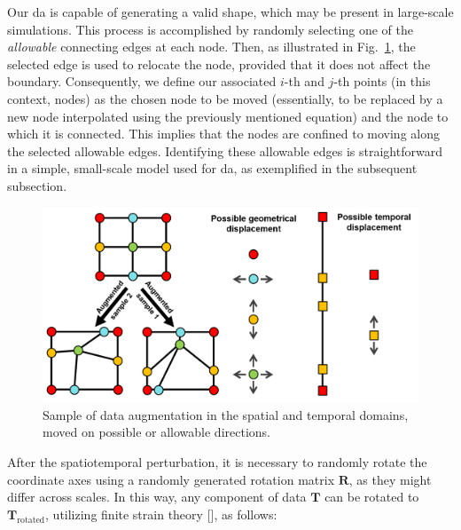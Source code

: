 Our \ac{da} is capable of generating a valid shape, which may be present in large-scale simulations. This process is accomplished by randomly selecting one of the \textit{allowable} connecting edges at each node. Then, as illustrated in Fig.~\ref{fig:augmentation}, the selected edge is used to relocate the node, provided that it does not affect the boundary. Consequently, we define our associated $i$-th and $j$-th points (in this context, nodes) as the chosen node to be moved (essentially, to be replaced by a new node interpolated using the previously mentioned equation) and the node to which it is connected. This implies that the nodes are confined to moving along the selected allowable edges. Identifying these allowable edges is straightforward in a simple, small-scale model used for \ac{da}, as exemplified in the subsequent subsection.
%
\begin{figure}\centering
\includegraphics[width=0.8\linewidth,keepaspectratio]{augmentation.png}
\caption{Sample of data augmentation in the spatial and temporal domains, moved on possible or allowable directions.}\label{fig:augmentation}
\end{figure}

After the spatiotemporal perturbation, it is necessary to randomly rotate the coordinate axes using a randomly generated rotation matrix $\mathbf{R}$, as they might differ across scales. In this way, any component of data $\mathbf{T}$ can be rotated to $\mathbf{T}_\text{rotated}$, utilizing finite strain theory [\cite{gerhard-book}], as follows:

